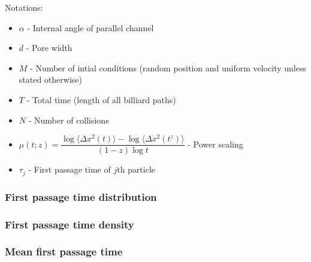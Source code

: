 \documentclass[a4paper,12pt]{article}
\begin{document}
\tableofcontents
Notations:
\begin{itemize}
    \item $\alpha$ - Internal angle of parallel channel
    \item $d$ - Pore width
    \item $M$ - Number of intial conditions (random position and uniform velocity unless stated otherwise)
    \item $T$ - Total time (length of all billiard paths)
    \item $N$ - Number of collisions
    \item $\mu(t; z) = \dfrac{\log \langle \Delta x^2(t) \rangle - \log \langle \Delta x^2 (t^z) \rangle}{(1 - z) \log t}$ - Power scaling
    \item $\tau_j$ - First passage time of $j$th particle
\end{itemize}



\clearpage
\subsubsection{First passage time distribution}


\clearpage
\subsubsection{First passage time density}

\clearpage
\subsubsection{Mean first passage time}
\end{document}

